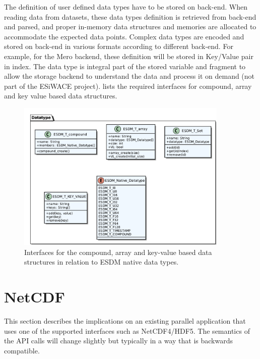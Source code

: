 The definition of user defined data types have to be stored on back-end. When
reading data from datasets, these data types definition is retrieved from back-end
and parsed, and proper in-memory data structures and memories are allocated to
accommodate the expected data points.
Complex data types are encoded and stored on back-end in various formats according
to different back-end.
For example, for the Mero backend, these definition will be stored in Key/Value pair in index.
The data type is integral part of the stored variable and fragment to allow the storage backend to understand the data and process it on demand (not part of the ESiWACE project).
 lists the required interfaces for compound, array and key value based data structures.

\begin{figure}
	\centering
	\includegraphics[width=0.9\textwidth]{figures/semantics-datatypes}
	\caption{Interfaces for the compound, array and key-value based data structures in relation to ESDM native data types.}
	\label{fig:data types}
\end{figure}

\chapter{NetCDF}

This section describes the implications on an existing parallel application that uses one of the supported interfaces such as NetCDF4/HDF5.
The semantics of the API calls will change slightly but typically in a way that is backwards compatible.

